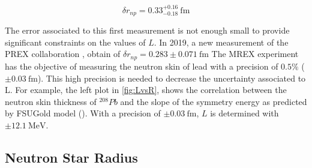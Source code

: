 \begin{equation} \label{eq:Prex}
\delta r_{np} = 0.33^{+0.16}_{-0.18} \SI{}{\femto \meter}
\end{equation}

The error associated to this first measurement is not enough small to provide significant constraints on the values of $L$. In 2019, a new measurement of the PREX collaboration \cite{PREX:2021umo}, obtain of $\delta r_{np} = 0.283 \pm 0.071 \SI{}{\femto \meter}$ The MREX experiment has the objective of measuring the neutron skin of lead with a precision of $0.5 \%$  ($\pm \SI{0.03}{\femto \meter}$). This high precision is needed to decrease the uncertainty associated to L. For example, the left plot in \ref{fig:LvsR}, shows the correlation between the neutron skin thickness of $^{208}Pb$ and the slope of the symmetry energy as predicted by FSUGold model (\cite{Fattoyev_2011}). With a precision of $\pm \SI{0.03}{\femto \meter}$, $L$ is determined with $\pm \SI{12.1}{\mega \electronvolt}$. 

\subsection{Neutron Star Radius}

